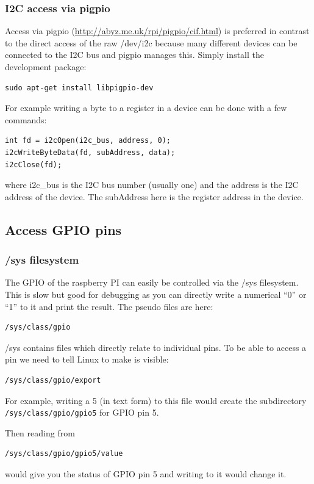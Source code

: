 \documentclass[12pt]{report}
\begin{document}
\subsubsection{I2C access via pigpio}
Access via pigpio (\url{http://abyz.me.uk/rpi/pigpio/cif.html})
is preferred in contrast to the direct
access of the raw /dev/i2c because many different devices
can be connected to the I2C bus and pigpio manages this.
Simply install the development package:
\begin{verbatim}
sudo apt-get install libpigpio-dev
\end{verbatim}
For example writing a byte to a register in a device can be done with a
few commands:
\begin{verbatim}
int fd = i2cOpen(i2c_bus, address, 0);
i2cWriteByteData(fd, subAddress, data);
i2cClose(fd);
\end{verbatim}
where i2c\_bus is the I2C bus number (usually one)
and the address is the I2C address of the device.
The subAddress here is the register address in the device.

\subsection{Access GPIO pins}
\subsubsection{/sys filesystem}
The GPIO of the raspberry PI can easily be controlled via
the /sys filesystem. This is slow but good for
debugging as you can directly write a numerical
``0'' or ``1'' to it and print the result. The
pseudo files are here:
\begin{verbatim}
/sys/class/gpio
\end{verbatim}

/sys contains files which directly relate to individual pins.
To be able to access a pin we need to tell Linux to make
is visible:
\begin{verbatim}
/sys/class/gpio/export
\end{verbatim}
For example, writing a 5 (in text form) to this file would
create the subdirectory \texttt{/sys/class/gpio/gpio5} for GPIO pin 5.

Then reading from
\begin{verbatim}
/sys/class/gpio/gpio5/value
\end{verbatim}
would give you the status of GPIO pin 5 and writing
to it would change it.
\end{document}
